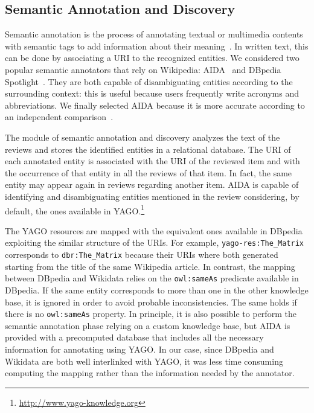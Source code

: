 \subsection{Semantic Annotation and Discovery}
\label{srr:sec:annotation}

Semantic annotation is the process of annotating textual or multimedia contents with semantic tags to add information about their meaning~\cite{Saathoff2010}. In written text, this can be done by associating a URI to the recognized entities. We considered two popular semantic annotators that rely on Wikipedia: AIDA~\cite{Hoffart2011} and DBpedia Spotlight~\cite{Daiber2013}. They are both capable of disambiguating entities according to the surrounding context: this is useful because users frequently write acronyms and abbreviations. We finally selected AIDA because it is more accurate according to an independent comparison~\cite{Gangemi2013}.

The module of semantic annotation and discovery analyzes the text of the reviews and stores the identified entities in a relational database. The URI of each annotated entity is associated with the URI of the reviewed item and with the occurrence of that entity in all the reviews of that item. In fact, the same entity may appear again in reviews regarding another item. AIDA is capable of identifying and disambiguating entities mentioned in the review considering, by default, the ones available in YAGO.\footnote{\url{http://www.yago-knowledge.org}}

The YAGO resources are mapped with the equivalent ones available in DBpedia exploiting the similar structure of the URIs. For example, \texttt{yago-res:The\_Matrix} corresponds to \texttt{dbr:The\_Matrix} because their URIs where both generated starting from the title of the same Wikipedia article. In contrast, the mapping between DBpedia and Wikidata relies on the \texttt{owl:sameAs} predicate available in DBpedia. If the same entity corresponds to more than one in the other knowledge base, it is ignored in order to avoid probable inconsistencies. The same holds if there is no \texttt{owl:sameAs} property. In principle, it is also possible to perform the semantic annotation phase relying on a custom knowledge base, but AIDA is provided with a precomputed database that includes all the necessary information for annotating using YAGO. In our case, since DBpedia and Wikidata are both well interlinked with YAGO, it was less time consuming computing the mapping rather than the information needed by the annotator.

